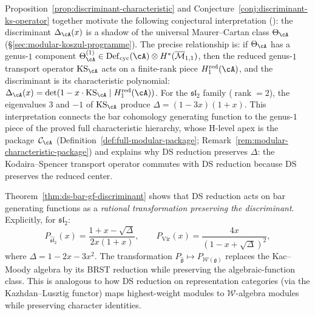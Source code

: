 \begin{remark}\label{rem:discriminant-universal-class}
Proposition~\ref{prop:discriminant-characteristic} and
Conjecture~\ref{conj:discriminant-ks-operator} together motivate the
following conjectural interpretation (\ClaimStatusConjectured): the
discriminant $\Delta_{\cA}(x)$ is a shadow of the universal
Maurer--Cartan class $\Theta_{\cA}$
(\S\ref{sec:modular-koszul-programme}).  The precise relationship
is: if $\Theta_{\cA}$ has a genus-$1$ component
$\Theta_{\cA}^{(1)} \in \operatorname{Def}_{\mathrm{cyc}}(\cA)
\otimes H^*(\overline{\mathcal{M}}_{1,1})$, then the reduced
genus-$1$ transport operator $\operatorname{KS}_{\cA}$ acts on
a finite-rank piece $H^{\mathrm{red}}_1(\cA)$, and the
discriminant is its characteristic polynomial:
$\Delta_{\cA}(x) = \det(1 - x \cdot \operatorname{KS}_{\cA}
\mid H^{\mathrm{red}}_1(\cA))$.  For the $\mathfrak{sl}_2$ family
($\operatorname{rank} = 2$), the eigenvalues $3$ and $-1$ of
$\operatorname{KS}_{\cA}$ produce
$\Delta = (1 - 3x)(1 + x)$.  This interpretation connects the
bar cohomology generating function to the genus-$1$ piece of
the proved full characteristic hierarchy, whose H-level apex is
the package~$\mathcal{C}_{\cA}$
(Definition~\ref{def:full-modular-package};
Remark~\ref{rem:modular-characteristic-package}) and explains why
DS reduction preserves $\Delta$: the Kodaira--Spencer transport
operator commutes with DS reduction because DS preserves the
reduced center.
\end{remark}

\begin{remark}\label{rem:ds-gf-transformation}
Theorem~\ref{thm:ds-bar-gf-discriminant} shows that DS reduction acts on bar generating functions as a \emph{rational transformation preserving the discriminant}.  Explicitly, for $\mathfrak{sl}_2$:
\[
P_{\widehat{\mathfrak{sl}}_2}(x) = \frac{1 + x - \sqrt{\Delta}}{2x(1+x)},
\qquad
P_{\mathrm{Vir}}(x) = \frac{4x}{(1 - x + \sqrt{\Delta})^2},
\]
where $\Delta = 1 - 2x - 3x^2$.  The transformation $P_{\widehat{\mathfrak{g}}} \mapsto P_{\mathcal{W}(\mathfrak{g})}$ replaces the Kac--Moody algebra by its BRST reduction while preserving the algebraic-function class.  This is analogous to how DS reduction on representation categories (via the Kazhdan--Lusztig functor) maps highest-weight modules to $\mathcal{W}$-algebra modules while preserving character identities.
\end{remark}

